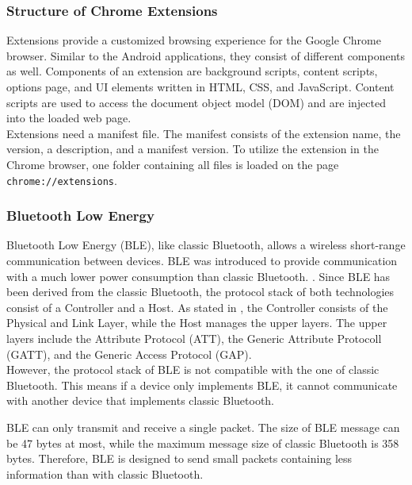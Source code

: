 \subsubsection*{Structure of Chrome Extensions}
Extensions provide a customized browsing experience for the Google Chrome browser. Similar to the Android applications, they consist of different components as well. Components of an extension are background scripts, content scripts, options page, and UI elements written in HTML, CSS, and JavaScript. \cite{Extensions} Content scripts are used to access the document object model (DOM) and are injected into the loaded web page. \cite{DBLP:conf/ndss/LiuZYC12} \\
Extensions need a manifest file. The manifest consists of the extension name, the version, a description, and a manifest version. To utilize the extension in the Chrome browser, one folder containing all files is loaded on the page \texttt{chrome://extensions}. \cite{Extensions}


\subsubsection*{Bluetooth Low Energy}
Bluetooth Low Energy (BLE), like classic Bluetooth, allows a wireless short-range communication between devices. BLE was introduced to provide communication with a much lower power consumption than classic Bluetooth. \cite{DBLP:journals/sensors/GomezOP12}. Since BLE has been derived from the classic Bluetooth, the protocol stack of both technologies consist of a Controller and a Host. As stated in \cite{overview and eval ble}, the Controller consists of the Physical and Link Layer, while the Host manages the upper layers. The upper layers include the Attribute Protocol (ATT), the Generic Attribute Protocoll (GATT), and the Generic Access Protocol (GAP). \\
However, the protocol stack of BLE is not compatible with the one of classic Bluetooth. This means if a device only implements BLE, it cannot communicate with another device that implements classic Bluetooth. \cite{DBLP:journals/sensors/GomezOP12}

BLE can only transmit and receive a single packet. \cite{DBLP:conf/woot/Ryan13} The size of BLE message can be 47 bytes at most, while the maximum message size of classic Bluetooth is 358 bytes. \cite{DBLP:journals/sensors/GomezOP12} Therefore, BLE is designed to send small packets containing less information than with classic Bluetooth.

